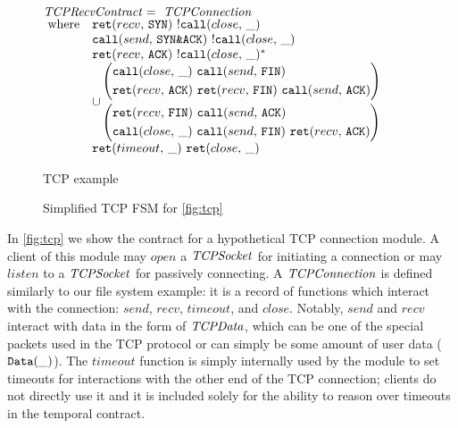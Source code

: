 \begin{figure}
 $\tcprecvc =~ \tcpc$ \\
 $\begin{array}{ @{~}r@{\quad} l @{}l @{}l }
  \text{where}
  &&\rcv{\tcpsyn}~ \notclose \\
  &&\send{\tcpsynack}~ \notclose \\
  &&\rcv{\tcpack}~ \stmany{\notclose} \\

  &&\cup
  \begin{aligned}
   &\left(
    \begin{aligned}
     &\call{close}~ \send{\tcpfin} \\
     &\rcv{\tcpack}~ \rcv{\tcpfin}~ \send{\tcpack}
    \end{aligned}
   \right) \\
   &\left(
    \begin{aligned}
     &\rcv{\tcpfin}~ \send{\tcpack} \\
     &\call{close}~ \send{\tcpfin}~ \rcv{\tcpack}
    \end{aligned}
   \right)
  \end{aligned} \\
  &&\ret{timeout}~ \ret{close}
 \end{array}$

 \caption{TCP example}
 \label{fig:tcp}
\end{figure}

\begin{figure}
 \centering
 \fontsize{4}{5} \selectfont
 \def \svgwidth{\columnwidth}
 
 \caption{Simplified TCP FSM for \autoref{fig:tcp}}
 \label{fig:tcp-fsm}
\end{figure}

In \autoref{fig:tcp} we show the contract for a hypothetical TCP connection module.
%
A client of this module may $open$ a $\mathit{TCPSocket}$ for initiating a connection or may $listen$ to a $\mathit{TCPSocket}$ for passively connecting.
%
A $\mathit{TCPConnection}$ is defined similarly to our file system example: it is a record of functions which interact with the connection: $send$, $recv$, $timeout$, and $close$.
%
Notably, $send$ and $recv$ interact with data in the form of $\mathit{TCPData}$, which can be one of the special packets used in the TCP protocol or can simply be some amount of user data ($\texttt{Data}(\_)$).
%
The $timeout$ function is simply internally used by the module to set timeouts for interactions with the other end of the TCP connection; clients do not directly use it and it is included solely for the ability to reason over timeouts in the temporal contract.

